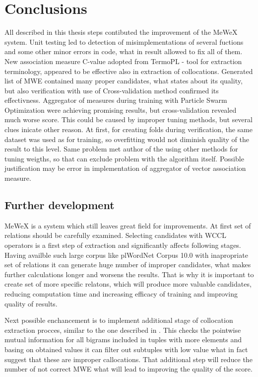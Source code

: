\chapter{Conclusions}

All described in this thesis steps contibuted the improvement of the MeWeX system. Unit testing led to detection of 
misimplementations of several fuctions and some other minor errors in code, what in result allowed to fix all of them. 
New association measure C-value adopted from TermoPL \cite{termopl} - tool for extraction terminology, appeared to be effective also in extraction of collocations. 
Generated list of MWE contained many proper candidates, what states about its quality, but also verification with use of Cross-validation 
method confirmed its effectivness. Aggregator of measures during training with Particle Swarm Optimization were achieving promising results, 
but cross-validation revealed much worse score. This could be caused by improper tuning methods, but several clues inicate other reason. 
At first, for creating folds during verification, the same dataset was used as for training, so overfitting would not diminish quality of 
the result to this level. Same problem met author of the \cite{mgr} using other methods for tuning weigths, so that can exclude 
problem with the algorithm itself. Possible justification may be error in implementation of aggregator of vector association measure.

\section{Further development}
MeWeX is a system which still leaves great field for improvements. At first set of relations should be carefully examined. 
Selecting candidates with WCCL operators is a first step of extraction and significantly affects following stages. 
Having availble such large corpus like plWordNet Corpus 10.0 with inapropriate set of relations it can generate huge number of improper candidates, 
what makes further calculations longer and worsens the results. That is why it is important to create set of more specific relatons, 
which will produce more valuable candidates, reducing computation time and increasing efficacy of training and improving quality of results.

Next possible enchancement is to implement additional stage of collocation extraction procces, similar to the one described in \cite{termopl}.
This checks the pointwise mutual information for all bigrams included in tuples with more elements and basing on obtained values it can 
filter out subtuples with low value what in fact suggest that these are improper callocations. That additional step will reduce the number of 
not correct MWE what will lead to improving the quality of the score.

